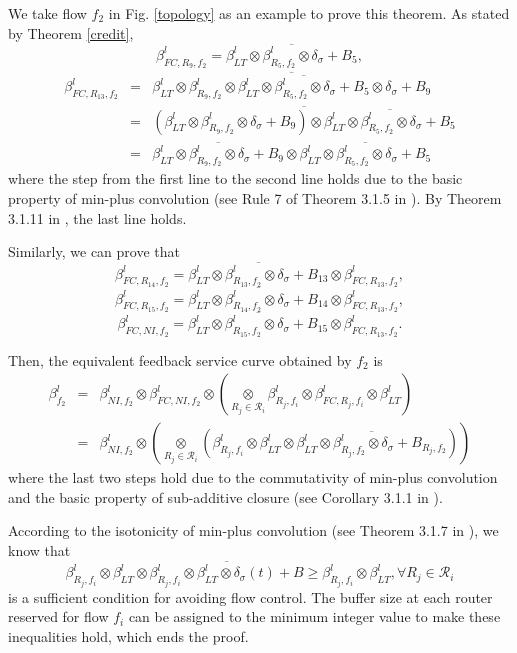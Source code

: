 \documentclass[preprint]{elsarticle}
\begin{document}
\begin{pf}
We take flow $f_2$ in Fig. \ref{topology} as an example to prove this theorem. As stated by Theorem \ref{credit}, $$\beta_{FC,R_9,f_2}^l=\overline{\beta^l_{LT}\otimes\beta_{R_5,f_2}^l\otimes\delta_\sigma+B_5},$$
\begin{eqnarray*}
\beta_{FC,R_{13},f_2}^l&=&\overline{\beta^l_{LT}\otimes\beta^l_{R_9,f_2}\otimes\overline{\beta^l_{LT}\otimes\beta^l_{R_5,f_2}\otimes\delta_\sigma+B_5}\otimes\delta_\sigma+B_9}\label{eq1}\\
&=&\overline{(\beta^l_{LT}\otimes\beta^l_{R_9,f_2}\otimes\delta_\sigma+B_9)\otimes\overline{\beta^l_{LT}\otimes\beta^l_{R_5,f_2}\otimes\delta_\sigma+B_5}}\label{eq2}\\
&=&\overline{\beta^l_{LT}\otimes\beta^l_{R_9,f_2}\otimes\delta_\sigma+B_9}\otimes\overline{\beta^l_{LT}\otimes\beta^l_{R_5,f_2}\otimes\delta_\sigma+B_5}\label{eq3}
\end{eqnarray*}
where the step from the first line to the second line holds due to the basic property of min-plus convolution (see Rule 7 of Theorem 3.1.5 in \cite{Boudec2001Network}). By Theorem 3.1.11 in \cite{Boudec2001Network}, the last line holds.

Similarly, we can prove that
$$\beta_{FC,R_{14},f_2}^l=\overline{\beta^l_{LT}\otimes\beta^l_{R_{13},f_2}\otimes\delta_\sigma+B_{13}}\otimes\beta_{FC,R_{13},f_2}^l,$$
$$\beta_{FC,R_{15},f_2}^l=\overline{\beta^l_{LT}\otimes\beta^l_{R_{14},f_2}\otimes\delta_\sigma+B_{14}}\otimes\beta_{FC,R_{13},f_2}^l,$$
$$\beta_{FC,NI,f_2}^l=\overline{\beta^l_{LT}\otimes\beta^l_{R_{15},f_2}\otimes\delta_\sigma+B_{15}}\otimes\beta_{FC,R_{13},f_2}^l.$$

Then, the equivalent feedback service curve obtained by $f_2$ is
\begin{eqnarray*}
\beta_{f_2}^l&=&\beta_{NI,f_2}^l\otimes\beta_{FC,NI,f_2}^l\otimes(\underset{R_j\in\mathcal{R}_i}{\otimes}\beta^l_{R_j,f_i}\otimes\beta^l_{FC,R_j,f_i}\otimes\beta_{LT}^l)\\
&=& \beta_{NI,f_2}^l\otimes(\underset{R_j\in\mathcal{R}_i}{\otimes}(\beta^l_{R_j,f_i}\otimes\beta_{LT}^l\otimes\overline{\beta^l_{LT}\otimes\beta^l_{R_{j},f_2}\otimes\delta_\sigma+B_{R_j,f_2}}))
\end{eqnarray*}
where the last two steps hold due to the commutativity of min-plus convolution and the basic property of sub-additive closure (see Corollary 3.1.1 in \cite{Boudec2001Network}).

According to the isotonicity of min-plus convolution (see Theorem 3.1.7 in \cite{Boudec2001Network}), we know that $$\beta_{R_j,f_i}^l\otimes\beta_{LT}^l\otimes\overline{\beta_{R_j,f_i}^l\otimes\beta_{LT}^l\otimes\delta_\sigma(t)+B}\geq\beta_{R_j,f_i}^l\otimes\beta_{LT}^l,\forall R_j\in\mathcal{R}_i$$ is a sufficient condition for avoiding flow control. The buffer size at each router reserved for flow $f_i$ can be assigned to the minimum integer value to make these inequalities hold, which ends the proof.
\end{pf}
\end{document}
